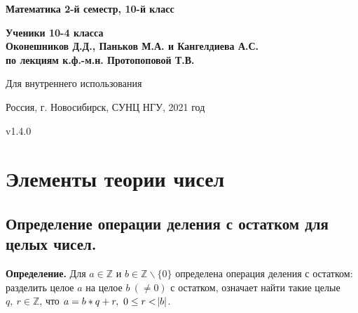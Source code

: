 \documentclass{article}
\begin{document}
    \begin{titlepage}
        \begin{center}
            \vspace*{1cm}
                
            \Huge
            \textbf{Математика 2-й семестр, 10-й класс}
                
            \vspace{5cm}
            
            \Large
            \textbf{Ученики 10-4 класса}\\
            \textbf{Оконешников Д.Д., Паньков М.А. и Кангелдиева А.С.}\\
            \textbf{по лекциям к.ф.-м.н. Протопоповой Т.В.}

            \vfill

            \vspace{0.8cm}

            \Large
            
            Для внутреннего использования
            
            Россия, г. Новосибирск, СУНЦ НГУ, 2021 год
            
            v1.4.0
                
        \end{center}
    \end{titlepage}
    \newpage
	
    \tableofcontents
	\thispagestyle{empty}
	\setcounter{tocdepth}{5}
	\newpage
    
    \section{Элементы теории чисел}
    	\subsection{Определение операции деления с остатком для целых чисел.}
    		\textbf{Определение.} Для \( a \in \mathbb{Z} \) и \( b \in \mathbb{Z} \backslash \{0\} \) определена операция деления с остатком: разделить целое \( a \) на целое \(b\ (\neq 0) \) с остатком, 
			означает найти такие целые \( q,\ r \in \mathbb{Z} \), что \(a=b*q+r,\ 0 \leq r < \abs{b} \).
            
\end{document}
